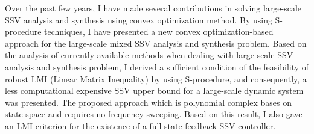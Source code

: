 \documentclass{article}
\begin{document}
Over the past few years, I have made several contributions in solving large-scale SSV analysis and synthesis
using convex optimization method.
By using S-procedure techniques, I have presented a new convex optimization-based
approach for the large-scale mixed SSV analysis and synthesis problem.
Based on the analysis of currently available methods when dealing with large-scale SSV analysis and synthesis problem,
I derived a sufficient condition of the feasibility of robust LMI (Linear Matrix Inequality)
by using S-procedure, and consequently, a less computational expensive SSV upper bound for
a large-scale dynamic system was presented.
The proposed approach {\citep{BGM15}} which is polynomial complex bases on state-space and requires no frequency sweeping.
Based on this result, I also gave an LMI criterion for the existence of a full-state feedback SSV controller{\citep{RDE85}}.


%









\end{document}
